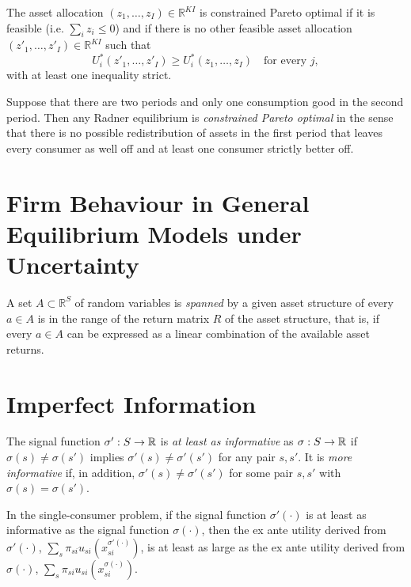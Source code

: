 \begin{defn}
    The asset allocation $(z_1, \dots, z_I) \in \mathbb{R}^{KI}$ is constrained Pareto optimal if it is feasible (i.e. $\sum_i z_i \leq 0$) and if there is no other feasible asset allocation $(z'_1, \dots, z'_I) \in \mathbb{R}^{KI}$ such that
    \begin{equation*}
        U^*_i(z'_1, \dots, z'_I) \geq U^*_i(z_1, \dots, z_I) \quad \text{for every } j,
    \end{equation*}
    with at least one inequality strict.
\end{defn}

\begin{prop}
    Suppose that there are two periods and only one consumption good in the second period. Then any Radner equilibrium is \emph{constrained Pareto optimal} in the sense that there is no possible redistribution of assets in the first period that leaves every consumer as well off and at least one consumer strictly better off.
\end{prop}


\section{Firm Behaviour in General Equilibrium Models under Uncertainty}

\begin{defn}
    A set $A \subset \mathbb{R}^{S}$ of random variables is \emph{spanned} by a given asset structure of every $a \in A$ is in the range of the return matrix $R$ of the asset structure, that is, if every $a \in A$ can be expressed as a linear combination of the available asset returns.
\end{defn}


\section{Imperfect Information}

\begin{defn}
    The signal function $\sigma': S \rightarrow \mathbb{R}$ is \emph{at least as informative} as $\sigma: S \rightarrow \mathbb{R}$ if $\sigma(s) \neq \sigma(s')$ implies $\sigma'(s) \neq \sigma'(s')$ for any pair $s, s'$. It is \emph{more informative} if, in addition, $\sigma'(s) \neq \sigma'(s')$ for some pair $s, s'$ with $\sigma(s) = \sigma(s')$.
\end{defn}

\begin{prop}
    In the single-consumer problem, if the signal function $\sigma'(\cdot)$ is at least as informative as the signal function $\sigma(\cdot)$, then the ex ante utility derived from $\sigma'(\cdot)$, $\sum_s \pi_{si} u_{si} (x_{si}^{\sigma'(\cdot)})$, is at least as large as the ex ante utility derived from $\sigma(\cdot)$, $\sum_s \pi_{si} u_{si} (x_{si}^{\sigma(\cdot)})$.
\end{prop}

